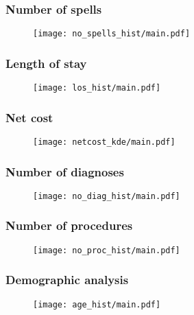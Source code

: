\begin{frame}
    \frametitle{Number of spells}

    \begin{figure}
    \texttt{[image: no\_spells\_hist/main.pdf]}
    \end{figure}
\end{frame}

\begin{frame}
    \frametitle{Length of stay}

    \begin{figure}
        \texttt{[image: los\_hist/main.pdf]}
    \end{figure}
\end{frame}

\begin{frame}
    \frametitle{Net cost}

    \begin{figure}
    \texttt{[image: netcost\_kde/main.pdf]}
    \end{figure}
\end{frame}

\begin{frame}
    \frametitle{Number of diagnoses}
   
    \begin{figure}
    \texttt{[image: no\_diag\_hist/main.pdf]}
    \end{figure}
\end{frame}

\begin{frame}
    \frametitle{Number of procedures}

    \begin{figure}
    \texttt{[image: no\_proc\_hist/main.pdf]}
    \end{figure}
\end{frame}

\begin{frame}
    \frametitle{Demographic analysis}

    \begin{figure}
    \texttt{[image: age\_hist/main.pdf]}
    \end{figure}
\end{frame}
